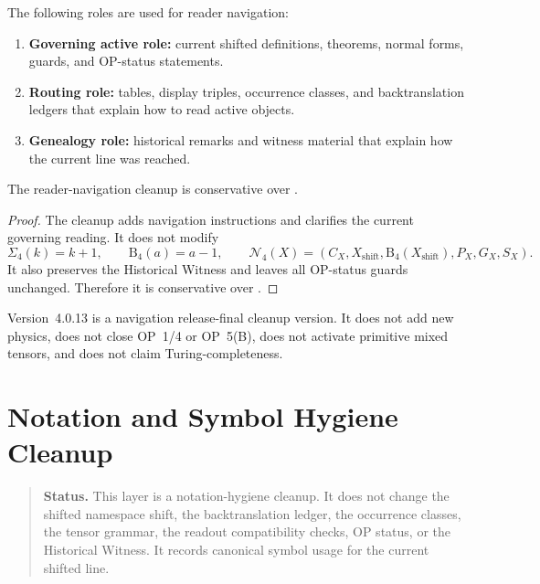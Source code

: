 \begin{definition}
\label{def:v402-governing-map-roles}
The following roles are used for reader navigation:
\begin{enumerate}[leftmargin=*]
 \item \textbf{Governing active role:} current shifted definitions, theorems,
 normal forms, guards, and OP-status statements.
 \item \textbf{Routing role:} tables, display triples, occurrence classes, and
 backtranslation ledgers that explain how to read active objects.
 \item \textbf{Genealogy role:} historical remarks and witness material that
 explain how the current line was reached.
\end{enumerate}
\end{definition}

\begin{lemma}
\label{lem:v402-navigation-cleanup-conservative}
The  reader-navigation cleanup is conservative over .
\end{lemma}

\begin{proof}
The cleanup adds navigation instructions and clarifies the current governing
reading. It does not modify
\[
 \Sigma_4(k)=k+1,\qquad
 \mathrm B_4(a)=a-1,\qquad
 \mathcal N_4(X)=(C_X,X_{\mathrm{shift}},\mathrm B_4(X_{\mathrm{shift}}),P_X,G_X,S_X).
\]
It also preserves the Historical Witness and leaves all OP-status guards
unchanged. Therefore it is conservative over .
\end{proof}

\begin{remark}
\label{rem:v402-non-claim}
Version~4.0.13 is a navigation release-final cleanup version. It does not add new physics,
does not close OP~1/4 or OP~5(B), does not activate primitive mixed tensors,
and does not claim Turing-completeness.
\end{remark}



\clearpage
\section{ Notation and Symbol Hygiene Cleanup}
\label{sec:v403-notation-symbol-hygiene-cleanup}

\begin{quote}\small
\noindent\textbf{Status.}
This  layer is a notation-hygiene cleanup. It does not change the shifted
namespace shift, the backtranslation ledger, the occurrence classes, the tensor
grammar, the readout compatibility checks, OP status, or the Historical
Witness. It records canonical symbol usage for the current shifted line.
\end{quote}


